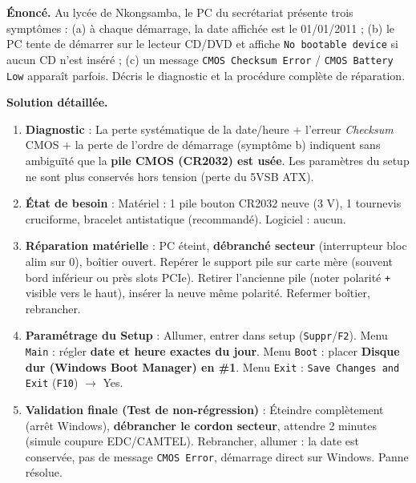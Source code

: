 \documentclass[11pt]{article}
\begin{document}
\begin{exoresolu}
\textbf{Énoncé.} Au lycée de Nkongsamba, le PC du secrétariat présente trois symptômes : (a) à chaque démarrage, la date affichée est le 01/01/2011 ; (b) le PC tente de démarrer sur le lecteur CD/DVD et affiche \texttt{No bootable device} si aucun CD n'est inséré ; (c) un message \texttt{CMOS Checksum Error} / \texttt{CMOS Battery Low} apparaît parfois. Décris le diagnostic et la procédure complète de réparation.

\tcblower
\textbf{Solution détaillée.}
\begin{enumerate}
  \item \textbf{Diagnostic} : La perte systématique de la date/heure + l'erreur \emph{Checksum} CMOS + la perte de l'ordre de démarrage (symptôme b) indiquent sans ambiguïté que la \textbf{pile CMOS (CR2032) est usée}. Les paramètres du setup ne sont plus conservés hors tension (perte du 5VSB ATX).
  \item \textbf{État de besoin} : Matériel : 1 pile bouton CR2032 neuve (3 V), 1 tournevis cruciforme, bracelet antistatique (recommandé). Logiciel : aucun.
  \item \textbf{Réparation matérielle} : PC éteint, \textbf{débranché secteur} (interrupteur bloc alim sur 0), boîtier ouvert. Repérer le support pile sur carte mère (souvent bord inférieur ou près slots PCIe). Retirer l'ancienne pile (noter polarité \texttt{+} visible vers le haut), insérer la neuve même polarité. Refermer boîtier, rebrancher.
  \item \textbf{Paramétrage du Setup} : Allumer, entrer dans setup (\texttt{Suppr}/\texttt{F2}). Menu \texttt{Main} : régler \textbf{date et heure exactes du jour}. Menu \texttt{Boot} : placer \textbf{Disque dur (Windows Boot Manager) en \#1}. Menu \texttt{Exit} : \texttt{Save Changes and Exit} (\texttt{F10}) $\to$ Yes.
  \item \textbf{Validation finale (Test de non-régression)} : Éteindre complètement (arrêt Windows), \textbf{débrancher le cordon secteur}, attendre 2 minutes (simule coupure EDC/CAMTEL). Rebrancher, allumer : la date est conservée, pas de message \texttt{CMOS Error}, démarrage direct sur Windows. Panne résolue.
\end{enumerate}
\end{exoresolu}
\end{document}
